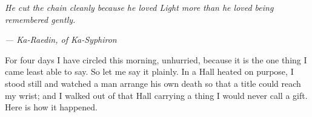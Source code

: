 
\textit{He cut the chain cleanly because he loved Light more than he loved being remembered gently.}\par
\textit{--- Ka-Raedin, of Ka-Syphiron}\par

\ornament


For four days I have circled this morning, unhurried, because it is the one thing I came least able to say. So let me say it plainly. In a Hall heated on purpose, I stood still and watched a man arrange his own death so that a title could reach my wrist; and I walked out of that Hall carrying a thing I would never call a gift. Here is how it happened.\par

